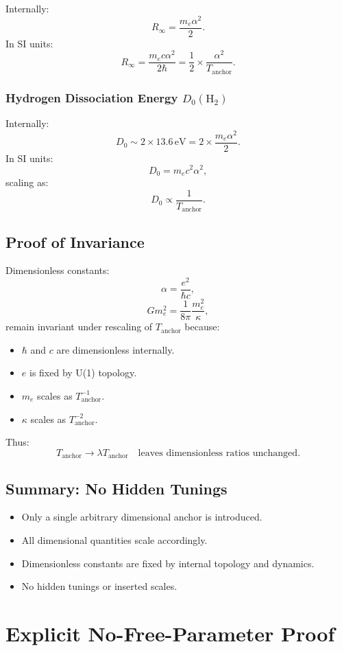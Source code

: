 \documentclass[12pt]{article}
\begin{document}
Internally:
\[
R_\infty = \frac{m_e \alpha^2}{2}.
\]
In SI units:
\[
R_\infty = \frac{m_e c \alpha^2}{2 \hbar} = \frac{1}{2} \times \frac{\alpha^2}{T_{\text{anchor}}}.
\]

\subsubsection{Hydrogen Dissociation Energy \( D_0(\text{H}_2) \)}

Internally:
\[
D_0 \sim 2 \times 13.6 \, \text{eV} = 2 \times \frac{m_e \alpha^2}{2}.
\]
In SI units:
\[
D_0 = m_e c^2 \alpha^2,
\]
scaling as:
\[
D_0 \propto \frac{1}{T_{\text{anchor}}}.
\]

\subsection{Proof of Invariance}

Dimensionless constants:
\[
\alpha = \frac{e^2}{\hbar c},
\]
\[
G m_e^2 = \frac{1}{8\pi} \frac{m_e^2}{\kappa},
\]
remain invariant under rescaling of \( T_{\text{anchor}} \) because:
\begin{itemize}
    \item \( \hbar \) and \( c \) are dimensionless internally.
    \item \( e \) is fixed by U(1) topology.
    \item \( m_e \) scales as \( T_{\text{anchor}}^{-1} \).
    \item \( \kappa \) scales as \( T_{\text{anchor}}^{-2} \).
\end{itemize}
Thus:
\[
T_{\text{anchor}} \to \lambda T_{\text{anchor}} \quad \text{leaves dimensionless ratios unchanged}.
\]

\subsection{Summary: No Hidden Tunings}

\begin{itemize}
    \item Only a single arbitrary dimensional anchor is introduced.
    \item All dimensional quantities scale accordingly.
    \item Dimensionless constants are fixed by internal topology and dynamics.
    \item No hidden tunings or inserted scales.
\end{itemize}

\newpage
\section{Explicit No-Free-Parameter Proof}
\end{document}
